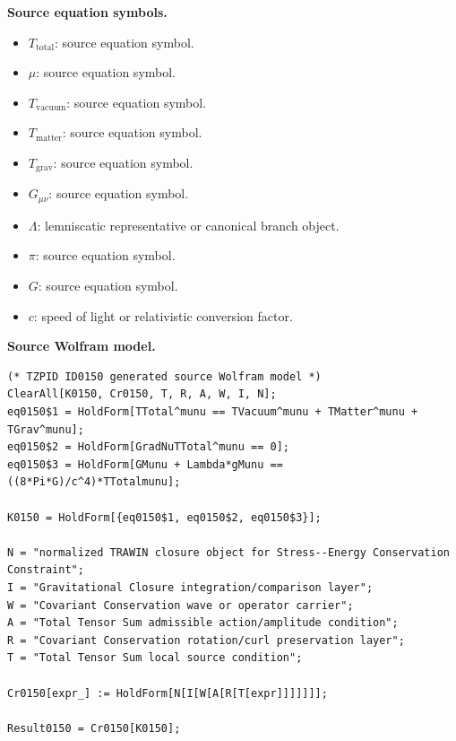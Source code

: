 \begin{minipage}[t]{0.49\linewidth}
\begingroup
\small
\raggedright
\textbf{Source equation symbols.}\par
\begin{itemize}[leftmargin=1.35em,itemsep=1pt,topsep=1pt,parsep=0pt]
    \item $T_{\mathrm{total}}$: source equation symbol.
    \item $\mu$: source equation symbol.
    \item $T_{\mathrm{vacuum}}$: source equation symbol.
    \item $T_{\mathrm{matter}}$: source equation symbol.
    \item $T_{\mathrm{grav}}$: source equation symbol.
    \item $G_{\mu\nu}$: source equation symbol.
    \item $\Lambda$: lemniscatic representative or canonical branch object.
    \item $\pi$: source equation symbol.
    \item $G$: source equation symbol.
    \item $c$: speed of light or relativistic conversion factor.
\end{itemize}
\endgroup
\end{minipage}\hfill
\begin{minipage}[t]{0.47\linewidth}
\begingroup
\scriptsize
\raggedright
\textbf{Source Wolfram model.}\par
\begin{Verbatim}[fontsize=\tiny,breaklines=true,breakanywhere=true]
(* TZPID ID0150 generated source Wolfram model *)
ClearAll[K0150, Cr0150, T, R, A, W, I, N];
eq0150$1 = HoldForm[TTotal^munu == TVacuum^munu + TMatter^munu + TGrav^munu];
eq0150$2 = HoldForm[GradNuTTotal^munu == 0];
eq0150$3 = HoldForm[GMunu + Lambda*gMunu == ((8*Pi*G)/c^4)*TTotalmunu];

K0150 = HoldForm[{eq0150$1, eq0150$2, eq0150$3}];

N = "normalized TRAWIN closure object for Stress--Energy Conservation Constraint";
I = "Gravitational Closure integration/comparison layer";
W = "Covariant Conservation wave or operator carrier";
A = "Total Tensor Sum admissible action/amplitude condition";
R = "Covariant Conservation rotation/curl preservation layer";
T = "Total Tensor Sum local source condition";

Cr0150[expr_] := HoldForm[N[I[W[A[R[T[expr]]]]]]];

Result0150 = Cr0150[K0150];
\end{Verbatim}
\endgroup
\end{minipage}

